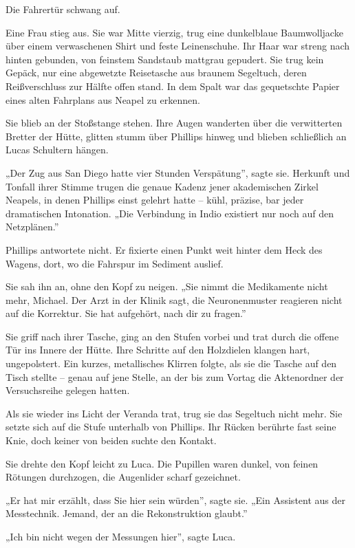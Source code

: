 \documentclass[
  ngerman,
]{article}
\begin{document}
Die Fahrertür schwang auf.

Eine Frau stieg aus. Sie war Mitte vierzig, trug eine dunkelblaue
Baumwolljacke über einem verwaschenen Shirt und feste Leinenschuhe. Ihr
Haar war streng nach hinten gebunden, von feinstem Sandstaub mattgrau
gepudert. Sie trug kein Gepäck, nur eine abgewetzte Reisetasche aus
braunem Segeltuch, deren Reißverschluss zur Hälfte offen stand. In dem
Spalt war das gequetschte Papier eines alten Fahrplans aus Neapel zu
erkennen.

Sie blieb an der Stoßstange stehen. Ihre Augen wanderten über die
verwitterten Bretter der Hütte, glitten stumm über Phillips hinweg und
blieben schließlich an Lucas Schultern hängen.

„Der Zug aus San Diego hatte vier Stunden Verspätung'', sagte sie.
Herkunft und Tonfall ihrer Stimme trugen die genaue Kadenz jener
akademischen Zirkel Neapels, in denen Phillips einst gelehrt hatte --
kühl, präzise, bar jeder dramatischen Intonation. „Die Verbindung in
Indio existiert nur noch auf den Netzplänen.''

Phillips antwortete nicht. Er fixierte einen Punkt weit hinter dem Heck
des Wagens, dort, wo die Fahrspur im Sediment auslief.

Sie sah ihn an, ohne den Kopf zu neigen. „Sie nimmt die Medikamente
nicht mehr, Michael. Der Arzt in der Klinik sagt, die Neuronenmuster
reagieren nicht auf die Korrektur. Sie hat aufgehört, nach dir zu
fragen.''

Sie griff nach ihrer Tasche, ging an den Stufen vorbei und trat durch
die offene Tür ins Innere der Hütte. Ihre Schritte auf den Holzdielen
klangen hart, ungepolstert. Ein kurzes, metallisches Klirren folgte, als
sie die Tasche auf den Tisch stellte -- genau auf jene Stelle, an der
bis zum Vortag die Aktenordner der Versuchsreihe gelegen hatten.

Als sie wieder ins Licht der Veranda trat, trug sie das Segeltuch nicht
mehr. Sie setzte sich auf die Stufe unterhalb von Phillips. Ihr Rücken
berührte fast seine Knie, doch keiner von beiden suchte den Kontakt.

Sie drehte den Kopf leicht zu Luca. Die Pupillen waren dunkel, von
feinen Rötungen durchzogen, die Augenlider scharf gezeichnet.

„Er hat mir erzählt, dass Sie hier sein würden'', sagte sie. „Ein
Assistent aus der Messtechnik. Jemand, der an die Rekonstruktion
glaubt.''

„Ich bin nicht wegen der Messungen hier'', sagte Luca.
\end{document}
